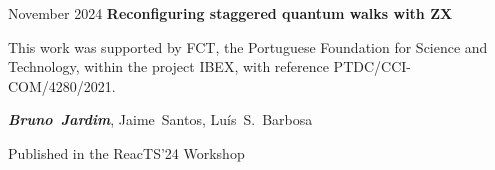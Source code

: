 \documentclass[10pt, letterpaper]{article}
\begin{document}
        \vspace{0.2 cm}

        \begin{samepage}
            \begin{twocolentry}{
                \normalsize{November 2024}
            }
                \textbf{Reconfiguring staggered quantum walks with ZX}

                \scriptsize{This work was supported by FCT, the Portuguese Foundation for Science and Technology, within the project IBEX, with reference PTDC/CCI-COM/4280/2021.}
                
            \end{twocolentry}

            \vspace{0.10 cm}
            
            \begin{onecolentry}
                \mbox{\textbf{\textit{Bruno Jardim}}}, \mbox{Jaime Santos}, \mbox{Luís S. Barbosa}

                \vspace{0.10 cm}
            Published in the ReacTS'24 Workshop
        \end{onecolentry}
        \end{samepage}


    



        

\end{document}
